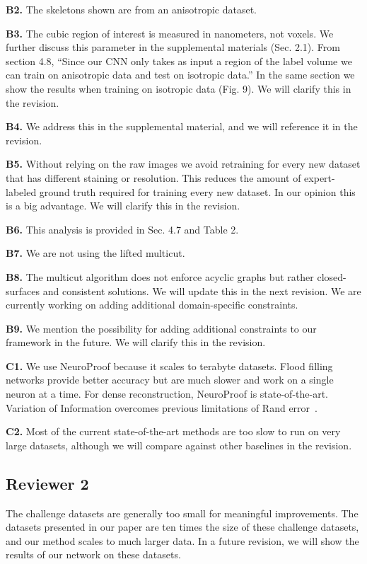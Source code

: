 \documentclass[10pt,twocolumn,letterpaper]{article}
\begin{document}
\textbf{B2.} 
The skeletons shown are from an anisotropic dataset.

\textbf{B3.} 
The cubic region of interest is measured in nanometers, not voxels. We further discuss this parameter in the supplemental materials (Sec. 2.1). From section 4.8, ``Since our CNN only takes as input a region of the label volume we can train on anisotropic data and test on isotropic data.'' In the same section we show the results when training on isotropic data (Fig. 9). We will clarify this in the revision.


\textbf{B4.} 
We address this in the supplemental material, and we will reference it in the revision. 

\textbf{B5.} 
Without relying on the raw images we avoid retraining for every new dataset that has different staining or resolution. This reduces the amount of expert-labeled ground truth required for training every new dataset. In our opinion this is a big advantage. We will clarify this in the revision.

\textbf{B6.} 
This analysis is provided in Sec. 4.7 and Table 2.

\textbf{B7.} 
We are not using the lifted multicut.

\textbf{B8.}
The multicut algorithm does not enforce acyclic graphs but rather closed-surfaces and consistent solutions. We will update this in the next revision. We are currently working on adding additional domain-specific constraints.

\textbf{B9.} 
We mention the possibility for adding additional constraints to our framework in the future. We will clarify this in the revision.

\textbf{C1.} 
We use NeuroProof because it scales to terabyte datasets. Flood filling networks provide better accuracy but are much slower and work on a single neuron at a time. For dense reconstruction, NeuroProof is state-of-the-art. Variation of Information overcomes previous limitations of Rand error~\cite{lee2017superhuman,nunez2013machine}.

\textbf{C2.} 
Most of the current state-of-the-art methods are too slow to run on very large datasets, although we will compare against other baselines in the revision.

\subsection*{Reviewer 2}

The challenge datasets are generally too small for meaningful improvements. The datasets presented in our paper are ten times the size of these challenge datasets, and our method scales to much larger data. In a future revision, we will show the results of our network on these datasets.
\end{document}

